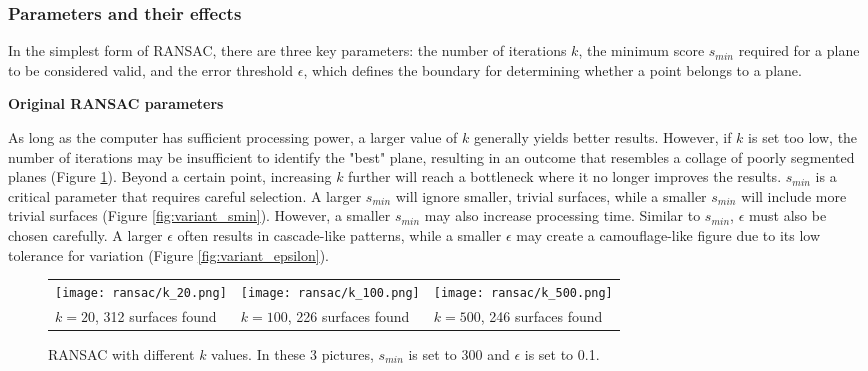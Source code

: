 \documentclass[a4paper,9pt]{article}
\begin{document}
\subsubsection{Parameters and their effects}
In the simplest form of RANSAC, there are three key parameters: the number of iterations $k$, the minimum score $s_{min}$ required for a plane to be considered valid, and the error threshold $\epsilon$, which defines the boundary for determining whether a point belongs to a plane.
\\\par

\textbf{Original RANSAC parameters}
\par
As long as the computer has sufficient processing power, a larger value of $k$ generally yields better results. However, if $k$ is set too low, the number of iterations may be insufficient to identify the "best" plane, resulting in an outcome that resembles a collage of poorly segmented planes (Figure \ref{fig:variant_k}). Beyond a certain point, increasing $k$ further will reach a bottleneck where it no longer improves the results.
$s_{min}$ is a critical parameter that requires careful selection. A larger $s_{min}$ will ignore smaller, trivial surfaces, while a smaller $s_{min}$ will include more trivial surfaces (Figure \ref{fig:variant_smin}). However, a smaller $s_{min}$ may also increase processing time.
Similar to $s_{min}$, $\epsilon$ must also be chosen carefully. A larger $\epsilon$ often results in cascade-like patterns, while a smaller $\epsilon$ may create a camouflage-like figure due to its low tolerance for variation (Figure \ref{fig:variant_epsilon}).

\begin{figure}[H]
    \begin{tabularx}{\textwidth}{XXX}
        \texttt{[image: ransac/k\_20.png]} & 
        \texttt{[image: ransac/k\_100.png]} & 
        \texttt{[image: ransac/k\_500.png]} \\
        $k = 20$, 312 surfaces found & $k = 100$, 226 surfaces found & $k = 500$, 246 surfaces found
    \end{tabularx}
    \caption{RANSAC with different $k$ values. In these 3 pictures, $s_{min}$ is set to 300 and $\epsilon$ is set to 0.1.}
    \label{fig:variant_k}
\end{figure}
\end{document}
